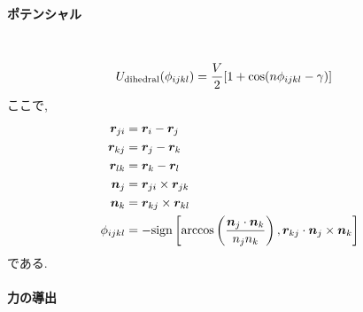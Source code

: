 \paragraph{ポテンシャル} \
\begin{alignat}{1}
   U_{\mathrm{dihedral}}(\phi_{ijkl})
  &=
  \frac{V}{2} [1 + \cos(n\phi_{ijkl} - \gamma)]
  \notag
\end{alignat}
ここで, 
\begin{alignat}{1}
 \bm{r}_{ji} &= \bm{r}_{i} - \bm{r}_{j}
 \notag \\
 \bm{r}_{kj} &= \bm{r}_{j} - \bm{r}_{k}
 \notag \\
 \bm{r}_{lk} &= \bm{r}_{k} - \bm{r}_{l}
 \notag \\
 \bm{n}_{j}  &= \bm{r}_{ji} \times \bm{r}_{jk}
 \notag \\
 \bm{n}_{k}  &= \bm{r}_{kj} \times \bm{r}_{kl}
 \notag
 \\
 \phi_{ijkl} &=
 - \mathrm{sign}
   \left[
         \arccos \left( \frac{\bm{n}_{j} \cdot \bm{n}_{k}}{n_{j} n_{k}}\right),
         \bm{r}_{kj} \cdot \bm{n}_{j} \times \bm{n}_{k}
   \right]
 \notag
\end{alignat}
である. 

\paragraph{力の導出} \

